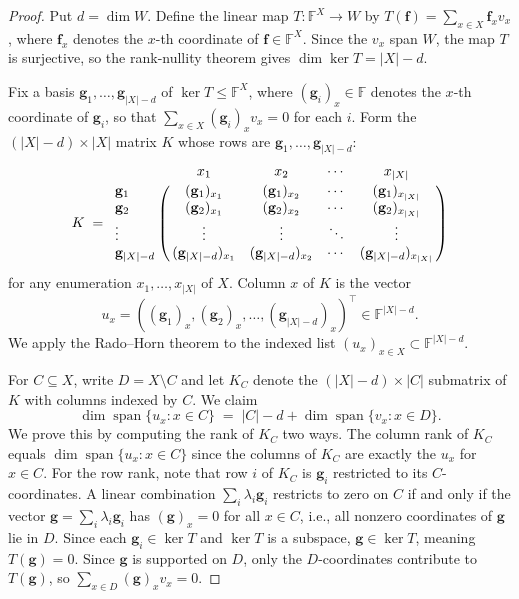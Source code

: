 \documentclass[11pt]{amsart}
\newcommand{\F}{\mathbb{F}}
\DeclareMathOperator{\Span}{span}
\begin{document}
\begin{proof}
Put $d = \dim W$. Define the linear map $T : \F^X \to W$ by
$T(\mathbf{f}) = \sum_{x \in X} \mathbf{f}_x v_x$, where $\mathbf{f}_x$
denotes the $x$-th coordinate of $\mathbf{f} \in \F^X$. Since the $v_x$ span
$W$, the map $T$ is surjective, so the rank-nullity theorem gives $\dim\ker T = |X| - d$.

Fix a basis $\mathbf{g}_1, \ldots, \mathbf{g}_{|X|-d}$ of $\ker T \leq \F^X$,
where $(\mathbf{g}_i)_x \in \F$ denotes the $x$-th coordinate of $\mathbf{g}_i$,
so that $\sum_{x \in X}(\mathbf{g}_i)_x v_x = 0$ for each $i$.
Form the $(|X|-d) \times |X|$ matrix $K$ whose rows are $\mathbf{g}_1, \ldots,
\mathbf{g}_{|X|-d}$:
$$
K \;=\;
\bordermatrix{
          & x_1                        & x_2                        & \cdots & x_{|X|}                        \cr
\mathbf{g}_1     & (\mathbf{g}_1)_{x_1}        & (\mathbf{g}_1)_{x_2}        & \cdots & (\mathbf{g}_1)_{x_{|X|}}        \cr
\mathbf{g}_2     & (\mathbf{g}_2)_{x_1}        & (\mathbf{g}_2)_{x_2}        & \cdots & (\mathbf{g}_2)_{x_{|X|}}        \cr
\vdots           & \vdots                      & \vdots                      & \ddots & \vdots                          \cr
\mathbf{g}_{|X|-d} & (\mathbf{g}_{|X|-d})_{x_1} & (\mathbf{g}_{|X|-d})_{x_2} & \cdots & (\mathbf{g}_{|X|-d})_{x_{|X|}} \cr
}
$$
for any enumeration $x_1,\ldots,x_{|X|}$ of $X$. Column $x$ of $K$ is the vector
$$u_x =
((\mathbf{g}_1)_x, (\mathbf{g}_2)_x, \ldots, (\mathbf{g}_{|X|-d})_x)^\top
\in \F^{|X|-d}.$$
We apply the Rado--Horn theorem to the indexed list
$(u_x)_{x \in X} \subset \F^{|X|-d}$.

For $C \subseteq X$, write $D = X\setminus C$ and let $K_C$ denote the
$(|X|-d)\times|C|$ submatrix of $K$ with columns indexed by $C$. We claim
\begin{equation}\label{eq:rankid}
        \dim\Span\{u_x : x \in C\} \;=\; |C| - d + \dim\Span\{v_x : x \in D\}.
\end{equation}
We prove this by computing the rank of $K_C$ two ways. The column rank of
$K_C$ equals $\dim\Span\{u_x : x \in C\}$ since the columns of $K_C$ are
exactly the $u_x$ for $x \in C$. For the row rank, note that row $i$ of $K_C$
is $\mathbf{g}_i$ restricted to its $C$-coordinates. A linear combination
$\sum_i \lambda_i \mathbf{g}_i$ restricts to zero on $C$ if and only if the
vector $\mathbf{g} = \sum_i \lambda_i \mathbf{g}_i$ has $(\mathbf{g})_x = 0$
for all $x \in C$, i.e., all nonzero coordinates of $\mathbf{g}$ lie in $D$.
Since each $\mathbf{g}_i \in \ker T$ and $\ker T$ is a subspace, $\mathbf{g}
\in \ker T$, meaning $T(\mathbf{g}) = 0$. Since $\mathbf{g}$ is supported on
$D$, only the $D$-coordinates contribute to $T(\mathbf{g})$, so
$\sum_{x\in D}(\mathbf{g})_x v_x = 0$.


\end{proof}
\end{document}
